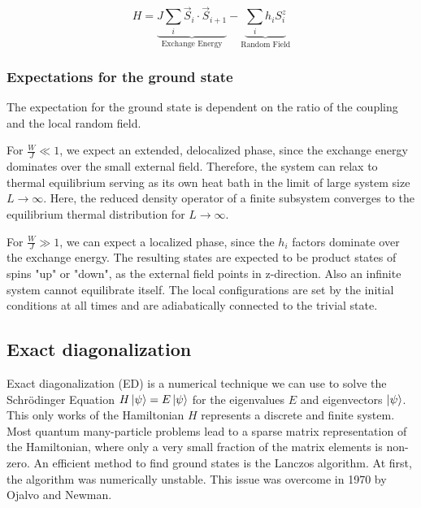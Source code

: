 \documentclass[reprint,amsmath,amssymb,aps,prb]{revtex4-2}
\begin{document}
\begin{equation}
	H=\underbrace{J\sum_i \vec{S}_i\cdot\vec{S}_{i+1}}_{\text{Exchange Energy}}-\underbrace{\sum_ih_iS_i^z}_{\text{Random Field}}\label{hamiltonian}
\end{equation}

\subsubsection{Expectations for the ground state}

The expectation for the ground state is dependent on the ratio of the coupling and the local random field. 

For $\frac{W}{J} \ll 1$, we expect an extended, delocalized phase, since the exchange energy dominates over the small external field. Therefore, the system can relax to thermal equilibrium serving as its own heat bath in the limit of large system size $L\rightarrow\infty$.
Here, the reduced density operator of a finite subsystem converges to the equilibrium thermal distribution
for $L\rightarrow\infty$.\cite{Pal2010}

For $\frac{W}{J} \gg 1$, we can expect a localized phase, since the $h_i$ factors dominate over the exchange energy. The resulting states are expected to be product states of spins "up" or "down", as the external field points in z-direction. Also an infinite system cannot equilibrate itself. The local configurations are set by the initial conditions at all times and are adiabatically connected to the trivial state.\cite{Pal2010}


\subsection{Exact diagonalization}

Exact diagonalization (ED) is a numerical technique we can use to solve the Schrödinger Equation $H\ket{\psi}=E\ket{\psi}$ for the eigenvalues $E$ and eigenvectors $\ket{\psi}$. This only works of the Hamiltonian $H$ represents a discrete and finite system. Most quantum many-particle problems lead to a sparse matrix representation of the Hamiltonian, where only a very small fraction of the matrix
elements is non-zero.\cite{Weisse2008} An efficient method to find ground states is the Lanczos algorithm.\cite{Lanczos1950} At first, the algorithm was numerically unstable. This issue was overcome in 1970 by Ojalvo and Newman.\cite{Ojalvo1970}
\end{document}
